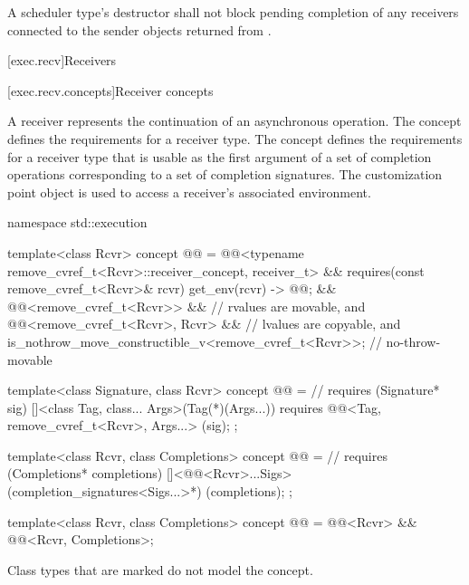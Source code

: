 \pnum
A scheduler type's destructor shall not block
pending completion of any receivers
connected to the sender objects returned from .

[exec.recv]{Receivers}

[exec.recv.concepts]{Receiver concepts}

\pnum
A receiver represents the continuation of an asynchronous operation.
The  concept defines
the requirements for a receiver type.
The  concept defines
the requirements for a receiver type that is usable as
the first argument of a set of completion operations
corresponding to a set of completion signatures.
The  customization point object is used to access
a receiver's associated environment.
\begin{codeblock}
namespace std::execution {
  template<class Rcvr>
    concept @@ =
      @@<typename remove_cvref_t<Rcvr>::receiver_concept, receiver_t> &&
      requires(const remove_cvref_t<Rcvr>& rcvr) {
        { get_env(rcvr) } -> @@;
      } &&
      @@<remove_cvref_t<Rcvr>> &&               // rvalues are movable, and
      @@<remove_cvref_t<Rcvr>, Rcvr> &&         // lvalues are copyable, and
      is_nothrow_move_constructible_v<remove_cvref_t<Rcvr>>;    // no-throw-movable

  template<class Signature, class Rcvr>
    concept @@ =                 // \expos
      requires (Signature* sig) {
        []<class Tag, class... Args>(Tag(*)(Args...))
            requires @@<Tag, remove_cvref_t<Rcvr>, Args...>
        {}(sig);
      };

  template<class Rcvr, class Completions>
    concept @@ =                      // \expos
      requires (Completions* completions) {
        []<@@<Rcvr>...Sigs>(completion_signatures<Sigs...>*)
        {}(completions);
      };

  template<class Rcvr, class Completions>
    concept @@ =
      @@<Rcvr> && @@<Rcvr, Completions>;
}
\end{codeblock}

\pnum
Class types that are marked  do not model the  concept.

